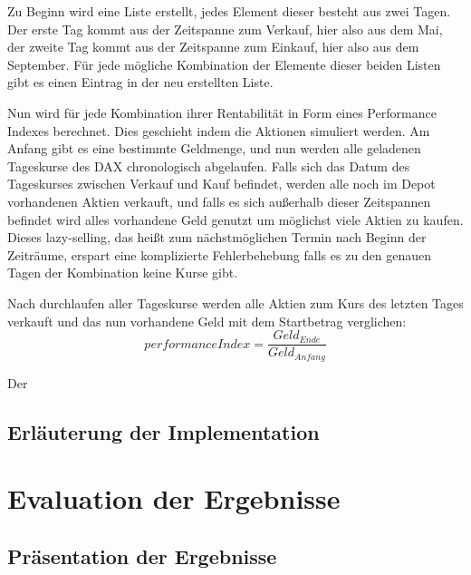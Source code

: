 \documentclass[12pt, a4paper, titlepage]{report}
\begin{document}
            Zu Beginn wird eine Liste erstellt, jedes Element dieser besteht aus
            zwei Tagen. Der erste Tag kommt aus der Zeitspanne zum Verkauf, hier
            also aus dem Mai, der zweite Tag kommt aus der Zeitspanne zum
            Einkauf, hier also aus dem September. Für jede mögliche Kombination
            der Elemente dieser beiden Listen gibt es einen Eintrag in der neu
            erstellten Liste.

            Nun wird für jede Kombination ihrer Rentabilität in Form eines
            Performance Indexes berechnet. Dies geschieht indem die Aktionen
            simuliert werden. Am Anfang gibt es eine bestimmte Geldmenge, und
            nun werden alle geladenen Tageskurse des DAX chronologisch
            abgelaufen. Falls sich das Datum des Tageskurses zwischen Verkauf
            und Kauf befindet, werden alle noch im Depot vorhandenen Aktien
            verkauft, und falls es sich außerhalb dieser Zeitspannen befindet
            wird alles vorhandene Geld genutzt um möglichst viele Aktien zu
            kaufen. Dieses lazy-selling, das heißt zum nächstmöglichen Termin nach
            Beginn der Zeiträume, erspart eine komplizierte Fehlerbehebung falls
            es zu den genauen Tagen der Kombination keine Kurse gibt.

            Nach durchlaufen aller Tageskurse werden alle Aktien zum Kurs des
            letzten Tages verkauft und das nun vorhandene Geld mit dem
            Startbetrag verglichen:
            \begin{equation}
                performanceIndex = \frac{Geld_{Ende}}{Geld_{Anfang}}
            \end{equation}



            Der

        \section{Erläuterung der Implementation}

    \chapter{Evaluation der Ergebnisse}

        \section{Präsentation der Ergebnisse}
\end{document}
